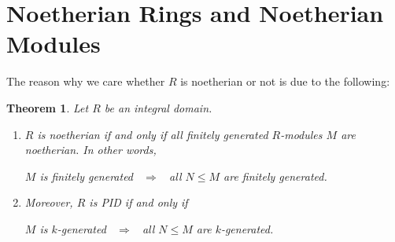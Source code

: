 \documentclass[11pt,openany]{book}
\theoremstyle{plain}
\newtheorem{theorem}{Theorem}[chapter]
\theoremstyle{definition}
\theoremstyle{remark}
\begin{document}
\section{Noetherian Rings and Noetherian Modules}
The reason why we care whether $R$ is noetherian or not is due to the following:
\begin{theorem}
    Let $R$ be an integral domain.
    \begin{enumerate}
        \item $R$ is noetherian if and only if all finitely generated $R$-modules $M$ are noetherian. In other words,
        \begin{center}
        $M$ is finitely generated \ $\Rightarrow$ \ all $N\leq M$ are finitely generated.    
        \end{center}
        \item Moreover, $R$ is PID if and only if
        \begin{center}
        $M$ is $k$-generated \ $\Rightarrow$ \ all $N\leq M$ are $k$-generated.    
        \end{center}
    \end{enumerate}
\end{theorem}
\end{document}
